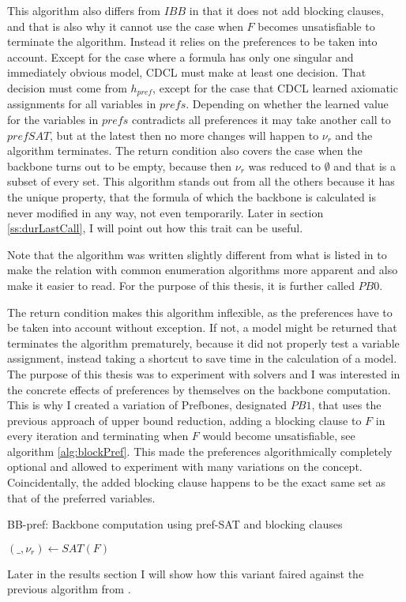 This algorithm also differs from $IBB$ in that it does not add blocking clauses, and that is also why it cannot use the case when $F$ becomes unsatisfiable to terminate the algorithm. Instead it relies on the preferences to be taken into account. Except for the case where a formula has only one singular and immediately obvious model, CDCL must make at least one decision. That decision must come from $h_{pref}$, except for the case that CDCL learned axiomatic assignments for all variables in $prefs$. Depending on whether the learned value for the variables in $prefs$ contradicts all preferences it may take another call to $prefSAT$, but at the latest then no more changes will happen to $\nu_r$ and the algorithm terminates. The return condition also covers the case when the backbone turns out to be empty, because then $\nu_r$ was reduced to $\emptyset$ and that is a subset of every set. This algorithm stands out from all the others because it has the unique property, that the formula of which the backbone is calculated is never modified in any way, not even temporarily. Later in section \ref{ss:durLastCall}, I will point out how this trait can be useful.

Note that the algorithm was written slightly different from what is listed in \cite{PJ18} to make the relation with common enumeration algorithms more apparent and also make it easier to read. For the purpose of this thesis, it is further called $PB0$.

The return condition makes this algorithm inflexible, as the preferences have to be taken into account without exception. If not, a model might be returned that terminates the algorithm prematurely, because it did not properly test a variable assignment, instead taking a shortcut to save time in the calculation of a model. The purpose of this thesis was to experiment with solvers and I was interested in the concrete effects of preferences by themselves on the backbone computation. This is why I created a variation of Prefbones, designated $PB1$, that uses the previous approach of upper bound reduction, adding a blocking clause to $F$ in every iteration and terminating when $F$ would become unsatisfiable, see algorithm \ref{alg:blockPref}. This made the preferences algorithmically completely optional and allowed to experiment with many variations on the concept. Coincidentally, the added blocking clause happens to be the exact same set as that of the preferred variables.

\begin{algorithm}
\caption{{\sc BB-pref: Backbone computation using pref-SAT and blocking clauses}}
\label{alg:blockPref}
\DontPrintSemicolon
{}

$(\_,\nu_r) \gets SAT(F)$\;

\end{algorithm}

Later in the results section I will show how this variant faired against the previous algorithm from \cite{PJ18}.
